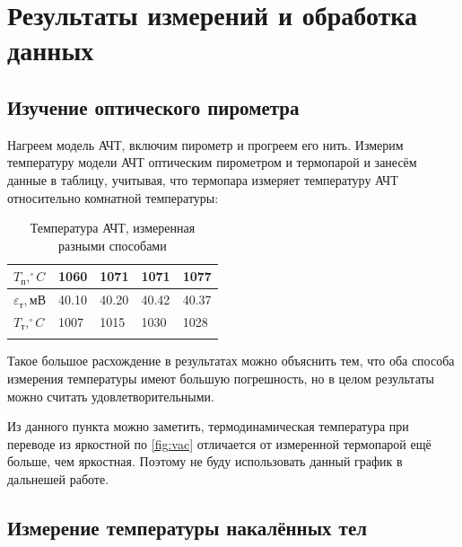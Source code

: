 \documentclass[a4paper,12pt]{article} %
\begin{document}
\newpage

\section * {Результаты измерений и обработка данных}

\subsection * {Изучение оптического пирометра}

Нагреем модель АЧТ, включим пирометр и прогреем его нить. Измерим температуру модели АЧТ оптическим пирометром и термопарой и занесём данные в таблицу, учитывая, что термопара измеряет температуру АЧТ относительно комнатной температуры:

\begin{table}[h!]
\caption{Температура АЧТ, измеренная разными способами}
\begin{tabular}{lllll}
\hline
\multicolumn{1}{|l|}{$T_\text{п}, ^\circ C$} & \multicolumn{1}{l|}{1060}  & \multicolumn{1}{l|}{1071}  & \multicolumn{1}{l|}{1071}  & \multicolumn{1}{l|}{1077}  \\ \hline
\multicolumn{1}{|l|}{$\varepsilon_\text{т}, \text{мВ}$}    & \multicolumn{1}{l|}{40.10} & \multicolumn{1}{l|}{40.20} & \multicolumn{1}{l|}{40.42} & \multicolumn{1}{l|}{40.37} \\ \hline
\multicolumn{1}{|l|}{$T_\text{т}, ^\circ C$}    & \multicolumn{1}{l|}{1007}  & \multicolumn{1}{l|}{1015}  & \multicolumn{1}{l|}{1030}  & \multicolumn{1}{l|}{1028}  \\ \hline
                           &                            &                            &                            &                           
\end{tabular}
\end{table}

Такое большое расхождение в результатах можно объяснить тем, что оба способа измерения температуры имеют большую погрешность, но в целом результаты можно считать удовлетворительными.

Из данного пункта можно заметить, термодинамическая температура при переводе из яркостной по \ref{fig:vac} отличается от измеренной термопарой ещё больше, чем яркостная. Поэтому не буду использовать данный график в дальнешей работе.

\subsection * {Измерение температуры накалённых тел}
\end{document}
